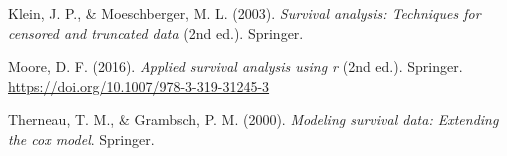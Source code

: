 \documentclass[
  letterpaper,
  DIV=11,
  numbers=noendperiod]{scrartcl}
\newlength{\cslhangindent}
\newenvironment{CSLReferences}[2] %
 {\begin{list}{}{%
  \setlength{\itemindent}{0pt}
  \setlength{\leftmargin}{0pt}
  \setlength{\parsep}{0pt}
  \ifodd #1
   \setlength{\leftmargin}{\cslhangindent}
   \setlength{\itemindent}{-1\cslhangindent}
  \fi
  \setlength{\itemsep}{#2\baselineskip}}}
 {\end{list}}
\begin{document}
\label{refs}
\begin{CSLReferences}{1}{0}
Klein, J. P., \& Moeschberger, M. L. (2003). \emph{Survival analysis:
Techniques for censored and truncated data} (2nd ed.). Springer.

Moore, D. F. (2016). \emph{Applied survival analysis using r} (2nd ed.).
Springer. \url{https://doi.org/10.1007/978-3-319-31245-3}

Therneau, T. M., \& Grambsch, P. M. (2000). \emph{Modeling survival
data: Extending the cox model}. Springer.

\end{CSLReferences}
\end{document}
